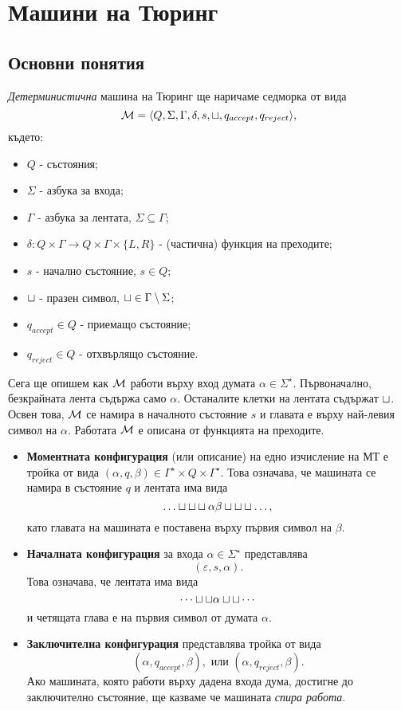 \chapter{Машини на Тюринг}

\newcommand{\tape}[1]{\dots\blank\blank\blank{#1}\blank\blank\blank\dots}
\section{Основни понятия}
{\em Детерминистична} машина на Тюринг ще наричаме седморка от вида 
\[\mathcal{M} = \langle{Q,\Sigma,\Gamma,\delta,s,\sqcup,q_{accept}, q_{reject}}\rangle,\] където:
\begin{itemize}
\item 
  $Q$ - състояния;
\item
  $\Sigma$ - азбука за входа;
\item
  $\Gamma$ - азбука за лентата, $\Sigma \subseteq \Gamma$;
\item
  $\delta:Q\times\Gamma \to Q\times \Gamma \times \{L,R\}$ - (частична) функция на преходите;
\item
  $s$ - начално състояние, $s \in Q$;
\item
  $\sqcup$ - празен символ,  $\sqcup \in \Gamma \setminus \Sigma$;
\item
  $q_{accept} \in Q$ - приемащо състояние;
\item
  $q_{reject} \in Q$ - отхвърлящо състояние.
\end{itemize}

Сега ще опишем как $\mathcal{M}$ работи върху вход думата $\alpha \in \Sigma^\star$.
Първоначално, безкрайната лента съдържа само $\alpha$. Останалите клетки на лентата съдържат $\sqcup$.
Освен това, $\mathcal{M}$ се намира в началното състояние $s$ и главата е върху най-левия символ на $\alpha$.
Работата $\mathcal{M}$ е описана от функцията на преходите.
  
\begin{itemize}
\item 
  {\bf Моментната конфигурация} (или описание) на едно изчисление на МТ е тройка от вида $(\alpha, q, \beta) \in \Gamma^\star\times Q \times \Gamma^\star$. Това означава, че
  машината се намира в състояние $q$ и лентата има вида
  \[\tape{\alpha\beta},\]
  като главата на машината е поставена върху първия символ на $\beta$.  
\item
  {\bf Началната конфигурация} за входа $\alpha \in \Sigma^\star$ представлява 
  \[(\varepsilon, s, \alpha).\]
  Това означава, че лентата има вида \[\cdots\sqcup\sqcup\alpha\sqcup\sqcup\cdots\]
  и четящата глава е на първия символ от думата $\alpha$.
\item
  {\bf Заключителна конфигурация} представлява тройка от вида
  \[(\alpha, q_{accept}, \beta), \text{ или }(\alpha, q_{reject}, \beta).\]
  Ако машината, която работи върху дадена входа дума, достигне до заключително състояние, ще казваме
  че машината {\em спира работа}.
\end{itemize}

